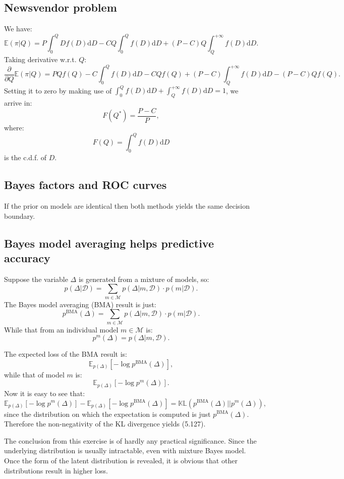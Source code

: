 \documentclass[UTF8]{ctexart}
\begin{document}
\subsection{Newsvendor problem}
We have:
$$\mathbb{E}(\pi|Q)=P\int_{0}^{Q}Df(D)\text{d}D-CQ\int_{0}^{Q}f(D)\text{d}D+(P-C)Q\int_{Q}^{+\infty}f(D)\text{d}D.$$
Taking derivative w.r.t. $Q$:
$$\frac{\partial}{\partial Q}\mathbb{E}(\pi|Q) = PQf(Q)-C\int_{0}^{Q}f(D)\text{d}D-CQf(Q)+(P-C)\int_{Q}^{+\infty}f(D)\text{d}D-(P-C)Qf(Q).$$
Setting  it to zero by making use of $\int_{0}^{Q}f(D)\text{d}D + \int_{Q}^{+\infty}f(D)\text{d}D=1$, we arrive in:
$$F(Q^{*})=\frac{P-C}{P},$$
where:
$$F(Q)=\int_{0}^{Q}f(D)\text{d}D$$
is the c.d.f. of $D$.

\subsection{Bayes factors and ROC curves}
If the prior on models are identical then both methods yields the same decision boundary.

\subsection{Bayes model averaging helps predictive accuracy}
Suppose the variable $\Delta$ is generated from a mixture of models, so:
$$p(\Delta|\mathcal{D})=\sum_{m\in\mathcal{M}}p(\Delta|m,\mathcal{D})\cdot p(m|\mathcal{D}).$$
The Bayes model averaging (BMA) result is just:
$$p^{\text{BMA}}(\Delta)=\sum_{m\in\mathcal{M}}p(\Delta|m,\mathcal{D})\cdot p(m|\mathcal{D}).$$
While that from an individual model $m\in \mathcal{M}$ is:
$$p^{m}(\Delta)=p(\Delta|m,\mathcal{D}).$$

The expected loss of the BMA result is:
$$\mathbb{E}_{p(\Delta)}[-\log p^{\text{BMA}}(\Delta)],$$
while that of model $m$ is:
$$\mathbb{E}_{p(\Delta)}[-\log p^{m}(\Delta)].$$
Now it is easy to see that:
$$\mathbb{E}_{p(\Delta)}[-\log p^{m}(\Delta)]-\mathbb{E}_{p(\Delta)}[-\log p^{\text{BMA}}(\Delta)]=\mathbb{KL}(p^{\text{BMA}}(\Delta)||p^{m}(\Delta)),$$
since the distribution on which the expectation is computed is just $p^{\text{BMA}}(\Delta)$.
Therefore the non-negativity of the KL divergence yields (5.127).

The conclusion from this exercise is of hardly any practical significance.
Since the underlying distribution is usually intractable, even with mixture Bayes model.
Once the form of the latent distribution is revealed, it is obvious that other distributions result in higher loss.
\end{document}
